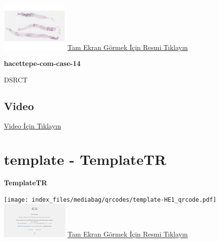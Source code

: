 \documentclass[
  letterpaper,
  DIV=11,
  numbers=noendperiod]{scrreprt}
\begin{document}
\href{https://images.patolojiatlasi.com/hacettepe-com-case-1/HE.html}{\includegraphics[width=0.25\textwidth,height=\textheight]{./screenshots/thumbnail_hacettepe-com-case-14.png}}
\href{https://images.patolojiatlasi.com/hacettepe-com-case-14/HE.html}{Tam
Ekran Görmek İçin Resmi Tıklayın}

\textbf{hacettepe-com-case-14}

\begin{tcolorbox}[enhanced jigsaw, breakable, opacitybacktitle=0.6, arc=.35mm, colbacktitle=quarto-callout-tip-color!10!white, colback=white, toptitle=1mm, left=2mm, opacityback=0, colframe=quarto-callout-tip-color-frame, titlerule=0mm, rightrule=.15mm, bottomrule=.15mm, toprule=.15mm, bottomtitle=1mm, title=\textcolor{quarto-callout-tip-color}{\faLightbulb}\hspace{0.5em}{Tanı}, coltitle=black, leftrule=.75mm]

DSRCT

\end{tcolorbox}

\hypertarget{video-13}{%
\subsection{Video}\label{video-13}}

\href{https://www.youtube.com/watch?v=MVZntjhry6g}{Video İçin Tıklayın}

\hypertarget{sec-template}{%
\section{template - TemplateTR}\label{sec-template}}

\textbf{TemplateTR}

\texttt{[image: index\_files/mediabag/qrcodes/template-HE1\_qrcode.pdf]}
\href{https://images.patolojiatlasi.com/template/HE1.html}{\includegraphics[width=0.25\textwidth,height=\textheight]{./screenshots/thumbnail_template-HE1.png}}
\href{https://images.patolojiatlasi.com/template/HE1.html}{Tam Ekran
Görmek İçin Resmi Tıklayın}
\end{document}

